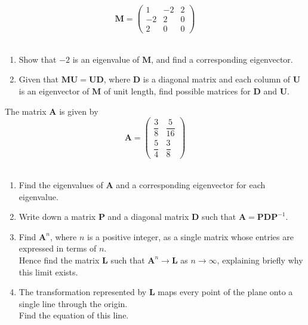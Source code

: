 \documentclass[leqno]{article}
\begin{document}
\begin{enumerate}[
  label=\textbf{\arabic*.},
  leftmargin=*,
  topsep=0pt,
  partopsep=0pt,
  parsep=0pt
]
\newpage

\questionitem

\[\mathbf{M} = \begin{pmatrix} 1 & -2 & 2 \\ -2 & 2 & 0 \\ 2 & 0 & 0 \end{pmatrix}\] \\
\begin{enumerate}[label=\textbf{(\alph*)}]
  \item Show that $-2$ is an eigenvalue of $\mathbf{M}$, and find a corresponding eigenvector.  \\
  \item Given that $\mathbf{MU} = \mathbf{UD}$, where $\mathbf{D}$ is a diagonal matrix and each column of $\mathbf{U}$ is an eigenvector of $\mathbf{M}$ of unit length, find possible matrices for $\mathbf{D}$ and $\mathbf{U}$.  \\
\end{enumerate}

\newpage

\questionitem

The matrix $\mathbf{A}$ is given by
\[\mathbf{A} = \begin{pmatrix} \dfrac{3}{8} & \dfrac{5}{16} \\[6pt] \dfrac{5}{4} & \dfrac{3}{8} \end{pmatrix}\] \\
\begin{enumerate}[label=\textbf{(\alph*)}]
  \item Find the eigenvalues of $\mathbf{A}$ and a corresponding eigenvector for each eigenvalue.  \\
  \item Write down a matrix $\mathbf{P}$ and a diagonal matrix $\mathbf{D}$ such that $\mathbf{A} = \mathbf{P}\mathbf{D}\mathbf{P}^{-1}$.  \\
  \item Find $\mathbf{A}^n$, where $n$ is a positive integer, as a single matrix whose entries are expressed in terms of $n$. \\
  Hence find the matrix $\mathbf{L}$ such that $\mathbf{A}^n \to \mathbf{L}$ as $n \to \infty$, explaining briefly why this limit exists.  \\
  \item The transformation represented by $\mathbf{L}$ maps every point of the plane onto a single line through the origin. \\
  Find the equation of this line.  \\
\end{enumerate}


\end{enumerate}
\end{document}
